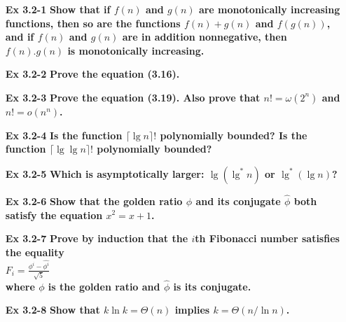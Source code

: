 \documentclass[fontsize=12pt,paper=a4,open=any]{book}
\begin{document}
\begin{enumerate}
	\item[\textbf{Ex 3.2-1}]
		\textbf{Show that if $f(n)$ and $g(n)$ are monotonically increasing functions, then so are the functions $f(n) + g(n)$ and $f(g(n))$, and if $f(n)$ and $g(n)$ are in addition nonnegative, then $f(n) . g(n)$ is monotonically increasing.}
		
	\item[\textbf{Ex 3.2-2}]
		\textbf{Prove the equation (3.16).}
		
	\item[\textbf{Ex 3.2-3}]
		\textbf{Prove the equation (3.19). Also prove that $n! = \omega(2^n)$ and $n! = o(n^n)$.}
		
	\item[\textbf{Ex 3.2-4}]
		\textbf{Is the function $\lceil \lg n \rceil !$ polynomially bounded? Is the function $\lceil \lg \lg n \rceil !$ polynomially bounded?}
		
	\item[\textbf{Ex 3.2-5}]
		\textbf{Which is asymptotically larger: $\lg(\lg^* n)$ or $\lg^*(\lg n)$?}
		
	\item[\textbf{Ex 3.2-6}]
		\textbf{Show that the golden ratio $\phi$ and its conjugate $\hat{\phi}$ both satisfy the equation $x^2 = x + 1$.}
		
	\item[\textbf{Ex 3.2-7}]
		\textbf{Prove by induction that the $i$th Fibonacci number satisfies the equality \\
		$F_i = \frac{\phi^i - \hat{\phi^i}}{\sqrt{5}}$ \\
		where $\phi$ is the golden ratio and $\hat{\phi}$ is its conjugate.}
		
	\item[\textbf{Ex 3.2-8}]
		\textbf{Show that $k \ln k = \Theta(n)$ implies $k=\Theta (n/\ln n)$.}
\end{enumerate}
\end{document}
